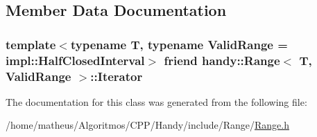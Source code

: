 \subsection{Member Data Documentation}
\subsubsection[{\texorpdfstring{Iterator}{Iterator}}]{\setlength{\rightskip}{0pt plus 5cm}template$<$typename T, typename Valid\+Range = impl\+::\+Half\+Closed\+Interval$>$ friend {\bf handy\+::\+Range}$<$ T, Valid\+Range $>$\+::{\bf Iterator}}\hypertarget{classhandy_1_1Range_a65634287fdb689e410c0c4af5bb2ec05}{}\label{classhandy_1_1Range_a65634287fdb689e410c0c4af5bb2ec05}


The documentation for this class was generated from the following file\+:\begin{DoxyCompactItemize}
\item 
/home/matheus/\+Algoritmos/\+C\+P\+P/\+Handy/include/\+Range/\hyperlink{Range_8h}{Range.\+h}\end{DoxyCompactItemize}
